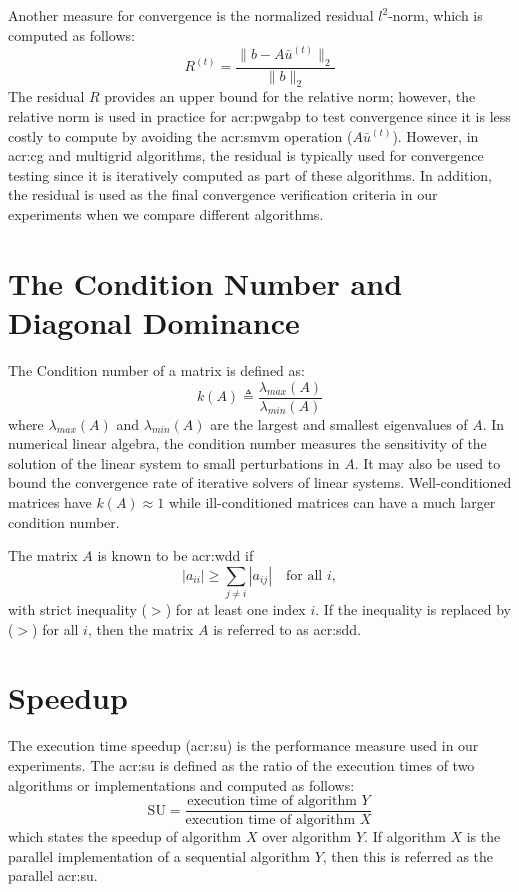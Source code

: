 Another measure for convergence is the normalized residual $l^2$-norm, which is computed as follows:
\begin{equation} 
	R^{(t)} = \frac{\parallel b - A\bar{u}^{(t)} \parallel_2}{\parallel b \parallel_2}
\end{equation}
The residual $R$ provides an upper bound for the relative norm; however, the relative norm is used in practice for \gls{acr:pwgabp} to test convergence since it is less costly to compute by avoiding the \gls{acr:smvm} operation ($A\bar{u}^{(t)}$).
However, in \gls{acr:cg} and multigrid algorithms, the residual is typically used for convergence testing since it is iteratively computed as part of these algorithms.
In addition, the residual is used as the final convergence verification criteria in our experiments when we compare different algorithms.

\section{The Condition Number and Diagonal Dominance} 
\label{sec:cndd}
The Condition number of a matrix is defined as:
\begin{equation}
k\left(A\right) \triangleq \frac{\lambda_{max}\left(A\right)}{\lambda_{min}\left(A\right)}
\end{equation} 
where $\lambda_{max}\left(A\right)$ and $\lambda_{min}\left(A\right)$ are the largest and smallest eigenvalues of $A$.
In numerical linear algebra, the condition number measures the sensitivity of the solution of the linear system to small perturbations in $A$.
It may also be used to bound the convergence rate of iterative solvers of linear systems.
Well-conditioned matrices have $k\left(A\right)\approx 1$ while ill-conditioned matrices can have a much larger condition number.

The matrix $A$ is known to be \gls{acr:wdd} if 
\begin{equation}
|a_{ii}| \geq \sum_{j\neq i} |a_{ij}| \quad\text{for all } i, \label{eq:diagDom}
\end{equation}
with strict inequality ($>$) for at least one index $i$.
If the inequality is replaced by ($>$) for all $i$, then the matrix $A$ is referred to as \gls{acr:sdd}.


\section{Speedup}


The execution time speedup (\gls{acr:su}) is the performance measure used in our experiments.
The \gls{acr:su} is defined as the ratio of the execution times of two algorithms or implementations and computed as follows:
\begin{equation}
	\text{SU} = \frac{\text{execution time of algorithm $Y$}}{\text{execution time of algorithm $X$}}
	\label{eqn:suET}
\end{equation}
which states the speedup of algorithm $X$ over algorithm $Y$.
If algorithm $X$ is the parallel implementation of a sequential algorithm $Y$, then this is referred as the parallel \gls{acr:su}.
